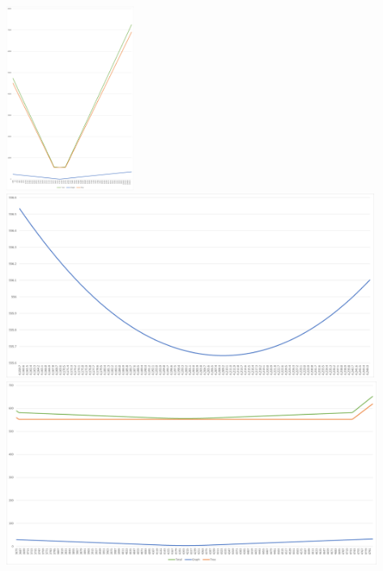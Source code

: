 \begin{frame}
{\includegraphics[width=0.48\linewidth, height=6cm]{PicRes/optstep3diff.png}
\includegraphics[width=0.48\linewidth, height=6cm]{PicRes/optstep3ref2.png} 
\includegraphics[width=0.48\linewidth, height=6cm]{PicRes/optstep3diffref.png} 
}
\end{frame}

